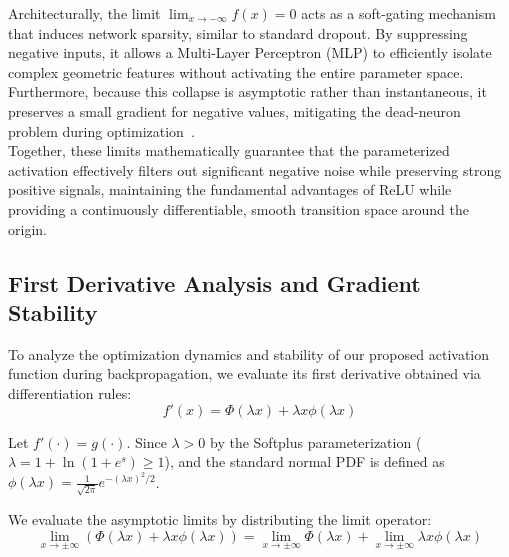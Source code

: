 \documentclass[11pt]{article}
\begin{document}
\noindent Architecturally, the limit $\lim_{x \to -\infty} f(x) = 0$ acts as a soft-gating mechanism that induces network sparsity, similar to standard dropout. By suppressing negative inputs, it allows a Multi-Layer Perceptron (MLP) to efficiently isolate complex geometric features without activating the entire parameter space. Furthermore, because this collapse is asymptotic rather than instantaneous, it preserves a small gradient for negative values, mitigating the dead-neuron problem during optimization~\cite{pmlr-v15-glorot11a, hendrycks2023gaussianerrorlinearunits}.\\

\noindent Together, these limits mathematically guarantee that the parameterized activation effectively filters out significant negative noise while preserving strong positive signals, maintaining the fundamental advantages of ReLU while providing a continuously differentiable, smooth transition space around the origin.

\subsection{First Derivative Analysis and Gradient Stability}
\noindent To analyze the optimization dynamics and stability of our proposed activation function during backpropagation, we evaluate its first derivative obtained via differentiation rules:
\begin{equation*}
f'(x) = \Phi(\lambda x) + \lambda x \phi(\lambda x)
\end{equation*}

\noindent Let $f'(\cdot) = g(\cdot)$. Since $\lambda > 0$ by the Softplus parameterization ($\lambda = 1 + \ln(1 + e^s) \ge 1$), and the standard normal PDF is defined as $\phi(\lambda x) = \frac{1}{\sqrt{2\pi}} e^{-(\lambda x)^2/2}$.

\noindent We evaluate the asymptotic limits by distributing the limit operator:
\begin{equation*}
\lim_{x \rightarrow \pm \infty}\left(\Phi(\lambda x) + \lambda x\phi(\lambda x)\right) = \lim_{x \rightarrow \pm \infty} \Phi(\lambda x) + \lim_{x \rightarrow \pm \infty} \lambda x\phi(\lambda x)
\end{equation*} 
\end{document}
